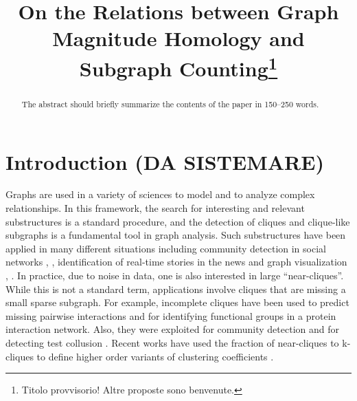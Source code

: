 \documentclass{article}
\begin{document}
	\title{On the Relations between Graph Magnitude Homology and Subgraph Counting\thanks{Titolo provvisorio! Altre proposte sono benvenute.}}
	\maketitle              %
	\begin{abstract}
		The abstract should briefly summarize the contents of the paper in
		150--250 words.
		
	\end{abstract}
	
	
	\section{Introduction (DA SISTEMARE)}
	
	Graphs are used in a variety of sciences to model and to analyze complex relationships. 
	In this framework, the search for interesting and relevant substructures is a standard procedure, and the detection of cliques and clique-like subgraphs is a fundamental tool in graph analysis.
	Such substructures have been applied in many different situations including community detection in social networks \cite{kumar1999trawling}, \cite{sozio2010community}, identification of real-time stories in the news \cite{angel2014dense} and graph visualization \cite{zhang2012extracting}, \cite{zhao2012large}.
	In practice, due to noise in data, one is also interested in large ``near-cliques''. 
	While this is not a standard term, applications involve cliques that are missing a small sparse subgraph.
	For example, incomplete cliques have been used to predict missing pairwise interactions \cite{zhang2012extracting} and for identifying functional groups \cite{han2007identifying} in a protein interaction network. 
	Also, they were exploited for community detection \cite{zhu2020community} and for detecting test collusion \cite{belov2021graph}.
	Recent works have used the fraction of near-cliques to k-cliques to define higher order variants of clustering coefficients \cite{yin2017local}.
	
\end{document}
